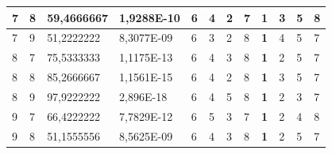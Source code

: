 \documentclass[conference]{IEEEtran}
\begin{document}
\begin{table}[]
\begin{tabular}{|llll|llllllll|}
		\multicolumn{1}{|l|}{7}   & \multicolumn{1}{l|}{8}         & \multicolumn{1}{l|}{59,4666667}    & 1,9288E-10 & \multicolumn{1}{l|}{6}   & \multicolumn{1}{l|}{4}          & \multicolumn{1}{l|}{2}          & \multicolumn{1}{l|}{7}   & \multicolumn{1}{l|}{\textbf{1}} & \multicolumn{1}{l|}{3}          & \multicolumn{1}{l|}{5}          & 8                      \\ \hline
		\multicolumn{1}{|l|}{7}   & \multicolumn{1}{l|}{9}         & \multicolumn{1}{l|}{51,2222222}    & 8,3077E-09 & \multicolumn{1}{l|}{6}   & \multicolumn{1}{l|}{3}          & \multicolumn{1}{l|}{2}          & \multicolumn{1}{l|}{8}   & \multicolumn{1}{l|}{\textbf{1}} & \multicolumn{1}{l|}{4}          & \multicolumn{1}{l|}{5}          & 7                      \\ \hline
		\multicolumn{1}{|l|}{8}   & \multicolumn{1}{l|}{7}         & \multicolumn{1}{l|}{75,5333333}    & 1,1175E-13 & \multicolumn{1}{l|}{6}   & \multicolumn{1}{l|}{4}          & \multicolumn{1}{l|}{3}          & \multicolumn{1}{l|}{8}   & \multicolumn{1}{l|}{\textbf{1}} & \multicolumn{1}{l|}{2}          & \multicolumn{1}{l|}{5}          & 7                      \\ \hline
		\multicolumn{1}{|l|}{8}   & \multicolumn{1}{l|}{8}         & \multicolumn{1}{l|}{85,2666667}    & 1,1561E-15 & \multicolumn{1}{l|}{6}   & \multicolumn{1}{l|}{4}          & \multicolumn{1}{l|}{2}          & \multicolumn{1}{l|}{8}   & \multicolumn{1}{l|}{\textbf{1}} & \multicolumn{1}{l|}{3}          & \multicolumn{1}{l|}{5}          & 7                      \\ \hline
		\multicolumn{1}{|l|}{8}   & \multicolumn{1}{l|}{9}         & \multicolumn{1}{l|}{97,9222222}    & 2,896E-18  & \multicolumn{1}{l|}{6}   & \multicolumn{1}{l|}{4}          & \multicolumn{1}{l|}{5}          & \multicolumn{1}{l|}{8}   & \multicolumn{1}{l|}{\textbf{1}} & \multicolumn{1}{l|}{2}          & \multicolumn{1}{l|}{3}          & 7                      \\ \hline
		\multicolumn{1}{|l|}{9}   & \multicolumn{1}{l|}{7}         & \multicolumn{1}{l|}{66,4222222}    & 7,7829E-12 & \multicolumn{1}{l|}{6}   & \multicolumn{1}{l|}{5}          & \multicolumn{1}{l|}{3}          & \multicolumn{1}{l|}{7}   & \multicolumn{1}{l|}{\textbf{1}} & \multicolumn{1}{l|}{2}          & \multicolumn{1}{l|}{4}          & 8                      \\ \hline
		\multicolumn{1}{|l|}{9}   & \multicolumn{1}{l|}{8}         & \multicolumn{1}{l|}{51,1555556}    & 8,5625E-09 & \multicolumn{1}{l|}{6}   & \multicolumn{1}{l|}{4}          & \multicolumn{1}{l|}{3}          & \multicolumn{1}{l|}{8}   & \multicolumn{1}{l|}{\textbf{1}} & \multicolumn{1}{l|}{2}          & \multicolumn{1}{l|}{5}          & 7                      \\ \hline

\end{tabular}
\end{table}
\end{document}
